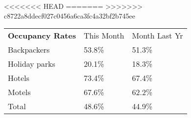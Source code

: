 <<<<<<< HEAD
=======
>>>>>>> c8722a8ddecf027c0456a6ca3fc4a32bf2b745ee
\begin{tabular}[t]{p{4.8cm}>{\hfill}p{1.3cm}>{\hfill}p{1.4cm}}
 \textbf{Occupancy Rates} & This Month & Month Last Yr \\ 
 Backpackers & 53.8\% & 51.3\% \\ 
  Holiday parks & 20.1\% & 18.3\% \\ 
  Hotels & 73.4\% & 67.4\% \\ 
  Motels & 67.6\% & 62.2\% \\ 
  Total & 48.6\% & 44.9\% \\ 
  \end{tabular}
